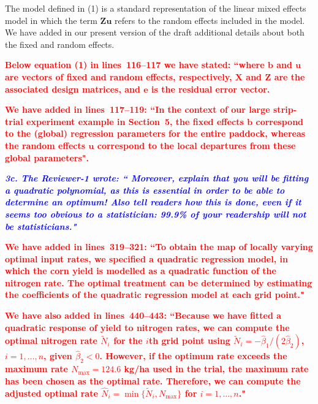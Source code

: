 \documentclass[a4paper]{article}   	%
\newcommand{\qtitle}[1]{\textit{\textbf{#1}}}
\begin{document}
\begin{enumerate}
     The model defined in (1) is a standard representation of the linear mixed effects model in which the term $\bm{Zu}$ refers to the random effects included in the model. We have added in our present version of the draft additional details about both the fixed and random effects.
     
     \textcolor{red}{\textbf{Below equation (1) in lines~116--117 we have stated: ``where $\bm{b}$ and $\bm{u}$ are vectors of fixed and random effects, respectively, $\bm{X}$ and $\bm{Z}$ are the associated design matrices, and $\bm{e}$ is the residual error vector.}}
     
     \textcolor{red}{\textbf{We have added in lines~117--119: ``In the context of our large strip-trial experiment example in Section~5, the fixed effects $\bm{b}$ correspond to the (global) regression parameters for the entire paddock, whereas the random effects $\bm{u}$ correspond to the local departures from these global parameters".}}
    
    
    \qtitle{\textcolor{blue}{3c. The Reviewer-1 wrote: `` Moreover, explain that you will be fitting a quadratic polynomial, as this is essential in order to be able to determine an optimum! Also tell readers how this is done, even if it seems too obvious to a statistician: 99.9\% of your readership will not be statisticians."}}
    
     \textcolor{red}{\textbf{We have added in lines~319--321: ``To obtain the map of locally varying optimal input rates, we specified a quadratic regression model, in which the corn yield is modelled as a quadratic function of the nitrogen rate. The optimal treatment can be determined by estimating the coefficients of the quadratic regression model at each grid point."}}
     
    
     \textcolor{red}{\textbf{We have also added in lines~440--443: ``Because we have fitted a quadratic response of yield to nitrogen rates, we can compute the optimal nitrogen rate $\tilde{N}_i$ for the $i$th grid point using $\tilde{N}_{i} = - \hat{\beta}_{1}/(2\hat{\beta}_{2})$, $i = 1, \ldots, n$, given $\hat{\beta}_{2} < 0$. However, if the optimum rate exceeds the maximum rate $N_{\mathrm{max}} = 124.6$ kg/ha used in the trial, the maximum rate has been chosen as the optimal rate. Therefore, we can compute the adjusted optimal rate $\hat{N}_{i} = \min\{\tilde{N}_{i}, N_{\mathrm{max}}\}$ for $i = 1, \ldots, n$."}}
    

\end{enumerate}
\end{document}

